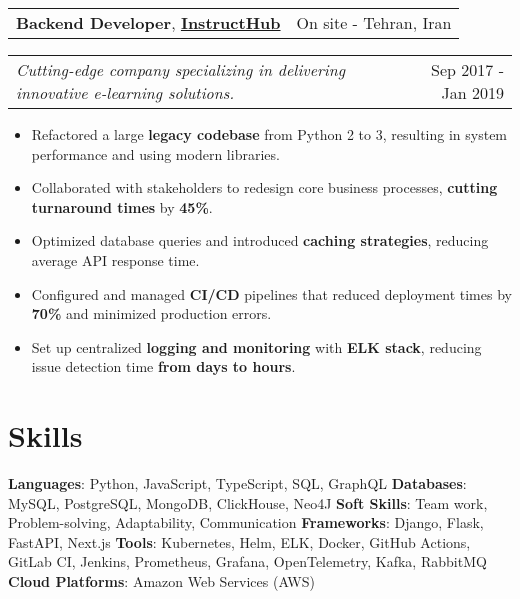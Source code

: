 \documentclass[letterpaper,11pt]{article}
\makeatletter
\newcommand{\resumeItemSimple}[1]{
  \item\small{
    {#1}
  }
}
\newcommand{\resumeSubheadingSimple}[5]{
    \begin{tabular*}{1\textwidth}[t]{l@{\extracolsep{\fill}}r}
      \textbf{#1}, \textbf{\href{#3}{#2}} \space \small#4 & \small#5 \\
    \end{tabular*}
}
\newcommand{\resumeSubSubheading}[2]{
    \begin{tabular*}{1\textwidth}{l@{\extracolsep{\fill}}r}
      \textit{\small#1} & \small #2 \\
    \end{tabular*}\vspace{-1pt}
}
\newcommand{\resumeItemListStart}{\begin{itemize}[leftmargin=0.5cm, itemsep=1pt, parsep=0pt]} %
\newcommand{\resumeItemListEnd}{\end{itemize}}
\newcommand{\titleWithDescription}[2]{\textbf{#1}{: #2}}
\makeatother
\begin{document}
  \resumeSubheadingSimple
    {Backend Developer}{InstructHub}{}{}{On site - Tehran, Iran}
      \resumeSubSubheading{Cutting-edge company specializing in delivering innovative e-learning solutions.}{Sep 2017 - Jan 2019}
      \resumeItemListStart
        \resumeItemSimple{Refactored a large \textbf{legacy codebase} from Python 2 to 3, resulting in system performance and using modern libraries.}
        \resumeItemSimple{Collaborated with stakeholders to redesign core business processes, \textbf{cutting turnaround times} by \textbf{45\%}.}
        \resumeItemSimple{Optimized database queries and introduced \textbf{caching strategies}, reducing average API response time.}
        \resumeItemSimple{Configured and managed \textbf{CI/CD} pipelines that reduced deployment times by \textbf{70\%} and minimized production errors.}
        \resumeItemSimple{Set up centralized \textbf{logging and monitoring} with \textbf{ELK stack}, reducing issue detection time \textbf{from days to hours}.}
      \resumeItemListEnd


\section{Skills}

  \titleWithDescription{Languages}{Python, JavaScript, TypeScript, SQL, GraphQL}\vspace{3pt}
  \hfill
  \titleWithDescription{Databases}{MySQL, PostgreSQL, MongoDB, ClickHouse, Neo4J}
  \newline
  \titleWithDescription{Soft Skills}{Team work, Problem-solving, Adaptability, Communication}
  \hfill
  \titleWithDescription{Frameworks}{Django, Flask, FastAPI, Next.js}\vspace{3pt}
  \newline
  \titleWithDescription{Tools}{Kubernetes, Helm, ELK, Docker, GitHub Actions, GitLab CI, Jenkins, Prometheus, Grafana, OpenTelemetry, Kafka, RabbitMQ}\vspace{3pt}
  \hfill
  \titleWithDescription{Cloud Platforms}{Amazon Web Services (AWS)}
\end{document}
